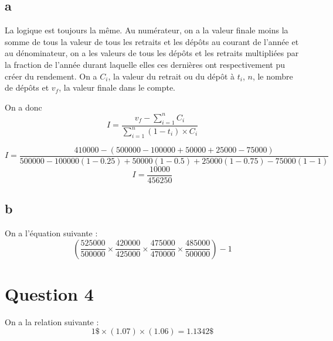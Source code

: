 \documentclass[11pt,french]{article}
\begin{document}
\subsection{a}
La logique est toujours la même. Au numérateur, on a la valeur finale moins la somme de tous la valeur de tous les retraits et les dépôts au courant de l'année et au dénominateur, on a les valeurs de tous les dépôts et les retraits multipliées par la fraction de l'année durant laquelle elles ces dernières ont respectivement pu créer du rendement. On a $C_i$, la valeur du retrait ou du dépôt à $t_i$, $n$, le nombre de dépôts et $v_f$, la valeur finale dans le compte. 

On a donc 
$$
I = \frac{v_f - \sum_{i=1}^n C_i}{\sum_{i=1}^n (1 - t_i) \times C_i}
$$

$$
I = \frac{410000 - (500000 - 100000 + 50000 + 25000 - 75000)}
{500000 - 100000 (1 - 0.25) + 50000 (1 - 0.5) + 25000 ( 1 - 0.75) - 75000 (1-1)}
$$
$$
I = \frac{10000}{456250}
$$

\subsection{b}
On a l'équation suivante :
$$
\left(\frac{525000}{500000}\times \frac{420000}{425000}
\times \frac{475000}{470000}\times\frac{485000}{500000} \right) - 1
$$

\section{Question 4}
On a la relation suivante :
$$
1 \$ \times (1.07) \times (1.06) = 1.1342 \$
$$
\end{document}
